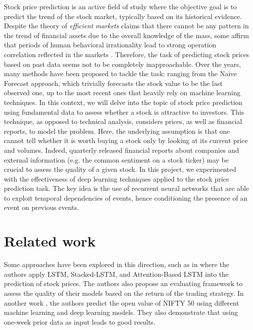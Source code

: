 \documentclass{article}
\begin{document}
Stock price prediction is an active field of study where the objective goal is to predict
the trend of the stock market, typically based on its historical evidence. Despite the
theory of \emph{efficient markets} claims that there cannot be any pattern in the trend
of financial assets due to the overall knowledge of the mass, some affirm that periods
of human behavioral irrationality lead to strong operation correlation reflected in the
markets \cite{adaptive_markets}. Therefore, the task of predicting stock prices based
on past data seems not to be completely inapproachable. Over the years,
many methods have been proposed to tackle the task: ranging from the Naive Forecast approach, which trivially forecasts the stock value to be the last observed one, up to the most recent ones that heavily rely on machine learning techniques. In this context, we will delve into the topic of stock price prediction using fundamental data to assess whether a stock is attractive to investors. 
This technique, as opposed to technical analysis, considers prices, as well as financial reports, to model the problem. Here, the underlying assumption is that one cannot tell whether it is worth buying a stock only by looking at its current price and volumes. Indeed, quarterly released financial reports about companies and external information (e.g. the common sentiment on a stock ticker) may be crucial to assess the quality of a given stock. In this project, we experimented with the effectiveness of deep learning techniques applied to the stock price prediction task. The key idea is the use of recurrent neural networks that are able to exploit temporal dependencies of events, hence conditioning the presence of an event on previous events.

\section{Related work}

Some approaches have been explored in this direction, such as in \cite{32066186} where the authors apply LSTM, Stacked-LSTM, and Attention-Based LSTM into the prediction of stock prices. The authors also propose an evaluating framework to assess the quality of their models based on the return of the trading strategy. In another work \cite{mehtab2020stock}, the authors predict the open value of NIFTY 50 using different machine learning and deep learning models. They also demonstrate that using one-week prior data as input leads to good results.
\end{document}

